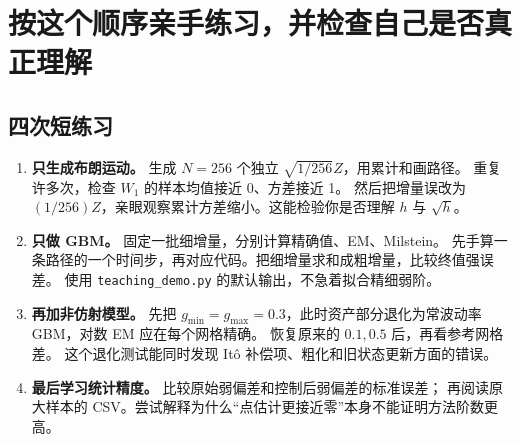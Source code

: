 \section{按这个顺序亲手练习，并检查自己是否真正理解}\label{sec:practice}
\subsection{四次短练习}
\begin{enumerate}
\item \textbf{只生成布朗运动。} 生成 $N=256$ 个独立 $\sqrt{1/256}Z$，用累计和画路径。
重复许多次，检查 $W_1$ 的样本均值接近 0、方差接近 1。
然后把增量误改为 $(1/256)Z$，亲眼观察累计方差缩小。这能检验你是否理解 $h$ 与 $\sqrt h$。
\item \textbf{只做 GBM。} 固定一批细增量，分别计算精确值、EM、Milstein。
先手算一条路径的一个时间步，再对应代码。把细增量求和成粗增量，比较终值强误差。
使用 \texttt{teaching\_demo.py} 的默认输出，不急着拟合精细弱阶。
\item \textbf{再加非仿射模型。} 先把 $g_{\min}=g_{\max}=0.3$，此时资产部分退化为常波动率 GBM，对数 EM 应在每个网格精确。
恢复原来的 $0.1,0.5$ 后，再看参考网格差。
这个退化测试能同时发现 Itô 补偿项、粗化和旧状态更新方面的错误。
\item \textbf{最后学习统计精度。} 比较原始弱偏差和控制后弱偏差的标准误差；
再阅读原大样本的 CSV。尝试解释为什么“点估计更接近零”本身不能证明方法阶数更高。
\end{enumerate}

